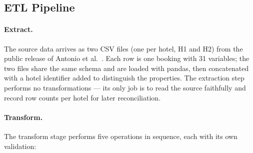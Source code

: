 \subsection{ETL Pipeline}

\paragraph{Extract.}
The source data arrives as two CSV files (one per hotel, H1 and H2) from the public release of Antonio et al.~\cite{antonio2019}. Each row is one booking with 31 variables; the two files share the same schema and are loaded with pandas, then concatenated with a hotel identifier added to distinguish the properties. The extraction step performs no transformations --- its only job is to read the source faithfully and record row counts per hotel for later reconciliation.

\paragraph{Transform.}
The transform stage performs five operations in sequence, each with its own validation:


